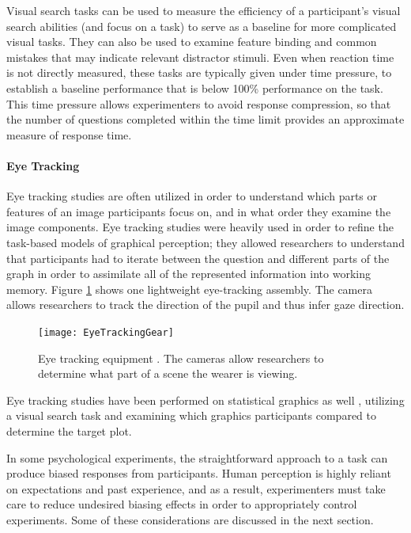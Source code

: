 \documentclass[11pt]{isuthesis}\usepackage[]{graphicx}\usepackage[]{color}
\begin{document}
Visual search tasks can be used to measure the efficiency of a participant's visual search abilities (and focus on a task) to serve as a baseline for more complicated visual tasks. They can also be used to examine feature binding and common mistakes that may indicate relevant distractor stimuli. Even when reaction time is not directly measured, these tasks are typically given under time pressure, to establish a baseline performance that is below 100\% performance on the task. This time pressure allows experimenters to avoid response compression, so that the number of questions completed within the time limit provides an approximate measure of response time.

\paragraph{Eye Tracking} \label{eyetracking}
Eye tracking studies are often utilized in order to understand which parts or features of an image participants focus on, and in what order they examine the image components. Eye tracking studies were heavily used in order to refine the task-based models of graphical perception; they allowed researchers to understand that participants had to iterate between the question and different parts of the graph in order to assimilate all of the represented information into working memory. Figure \ref{fig:eyetracking} shows one lightweight eye-tracking assembly. The camera allows researchers to track the direction of the pupil and thus infer gaze direction. 

\begin{figure}[htbp]\centering
\texttt{[image: EyeTrackingGear]}
\caption[Eye Tracking Equipment]{Eye tracking equipment \protect\citep{babcock2004building}. The cameras allow researchers to determine what part of a scene the wearer is viewing.}\label{fig:eyetracking}
\end{figure}

Eye tracking studies have been performed on statistical graphics as well \citep{zhao2013mind}, utilizing a visual search task and examining which graphics participants compared to determine the target plot.

In some psychological experiments, the straightforward approach to a task can produce biased responses from participants. Human perception is highly reliant on expectations and past experience, and as a result, experimenters must take care to reduce undesired biasing effects in order to appropriately control experiments. Some of these considerations are discussed in the next section. 
\end{document}
